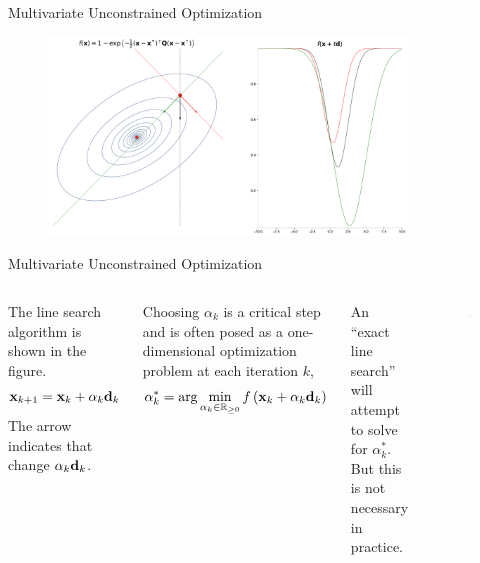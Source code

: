 \documentclass[aspectratio=169]{beamer}
\def\mf{\ensuremath\mathbf}
\def\mb{\ensuremath\mathbb}
\def\lp{\ensuremath\left(}
\def\rp{\ensuremath\right)}
\def\R{\ensuremath\mb{R}}
\newcommand{\ct}[1]{\lp #1\rp}
\begin{document}
\begin{frame}{Multivariate Unconstrained Optimization}
  \begin{figure}
    \centering
    \includegraphics[width=0.85\textwidth]{figs/multivar_linesearch_demo.pdf}
  \end{figure}
\end{frame}


\begin{frame} {Multivariate Unconstrained Optimization}
  \begin{columns}
    The line search algorithm is shown in the figure.
    \[ \mf{x}_{k+1} = \mf{x}_{k} + \alpha_k \mf{d}_{k} \]
    The arrow indicates that change $\alpha_k \mf{d}_k$.

    Choosing $\alpha_k$ is a critical step and is often posed as a one-dimensional optimization problem at each iteration $k$,
    \[ \alpha_k^* = \arg \min_{\alpha_k \in \R_{\geq 0}} f\ct{\mf{x}_k  +\alpha_k \mf{d}_k} \]

    An ``exact line search'' will attempt to solve for $\alpha_k^*$. But this is not necessary in practice.
    \begin{figure}
      \centering
      \includegraphics[width=0.9\textwidth]{figs/multivar_linesearch.pdf}
    \end{figure}
  \end{columns}
\end{frame}
\end{document}
